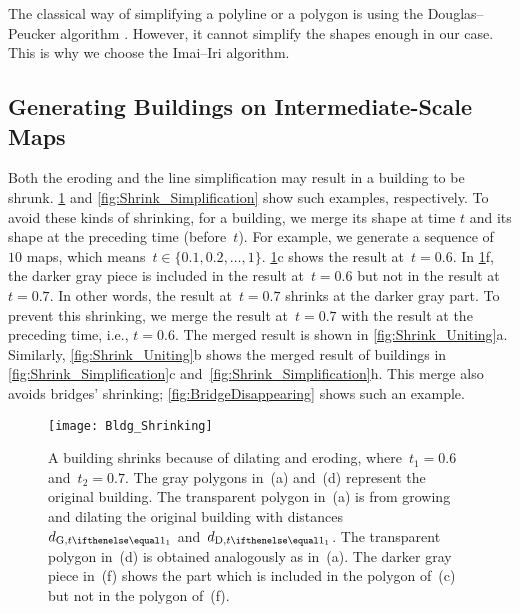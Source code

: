 The classical way of simplifying
a polyline or a polygon is using 
the Douglas--Peucker algorithm \citep{Douglas1973}. 
However, it cannot simplify the shapes enough in our case.
This is why we choose the Imai--Iri algorithm.


%
%
%
%


\subsection{Generating Buildings on Intermediate-Scale Maps}
\label{sec:Unite}

Both the eroding and the line simplification 
may result in a building to be shrunk.
\fig\ref{fig:Shrink_Erosion} and 
\fig\ref{fig:Shrink_Simplification} show such 
examples, respectively.
To avoid these kinds of shrinking,
for a building, we merge its shape at time $t$ 
and its shape at the preceding time (before~$t$). 
For example, we generate a sequence of~$10$ maps,
which means~$t \in \{0.1, 0.2, \dots, 1\}$.
\fig\ref{fig:Shrink_Erosion}c shows the result at~$t=0.6$.
In \fig\ref{fig:Shrink_Erosion}f, 
the darker gray piece is included in the result at~$t=0.6$
but not in the result at~$t=0.7$.
In other words, the result at~$t=0.7$ 
shrinks at the darker gray part.
To prevent this shrinking, 
we merge the result at~$t=0.7$ with 
the result at the preceding time, i.e., $t=0.6$.
The merged result is shown in \fig\ref{fig:Shrink_Uniting}a.
Similarly, \fig\ref{fig:Shrink_Uniting}b shows the merged 
result of buildings 
in \fig\ref{fig:Shrink_Simplification}c 
and~\fig\ref{fig:Shrink_Simplification}h.
This merge also avoids bridges' shrinking;
\fig\ref{fig:BridgeDisappearing} shows such an example.

\begin{figure}[tb]
\centering
\texttt{[image: Bldg\_Shrinking]}
\caption{A building shrinks because of dilating and eroding, 
	where~$t_1=0.6$ and~$t_2=0.7$.
	The gray polygons in~(a) and~(d) 
	represent the original building.
	The transparent polygon in~(a) is from 
	growing and dilating the original building with 
	distances~$\dtrm[1]{G}$ and~$\dtrm[1]{D}$.
	The transparent polygon in~(d) is obtained analogously
	as in~(a).
	The darker gray piece in~(f) shows 
	the part which is included in the polygon of~(c) 
	but not in the polygon of~(f).
}
\label{fig:Shrink_Erosion}
\end{figure}


